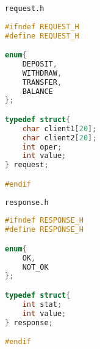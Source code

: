 \documentclass[12pt]{article}
\begin{document}
\verb|request.h|
\begin{lstlisting}[language=C, basicstyle=\scriptsize]
#ifndef REQUEST_H
#define REQUEST_H

enum{
    DEPOSIT,
    WITHDRAW,
    TRANSFER,
    BALANCE
};

typedef struct{
    char client1[20];
    char client2[20];
    int oper;
    int value;
} request;

#endif
\end{lstlisting}
\verb|response.h|
\begin{lstlisting}[language=C, basicstyle=\scriptsize]
#ifndef RESPONSE_H
#define RESPONSE_H

enum{
    OK,
    NOT_OK
};

typedef struct{
    int stat;
    int value;
} response;

#endif
\end{lstlisting}
\end{document}
